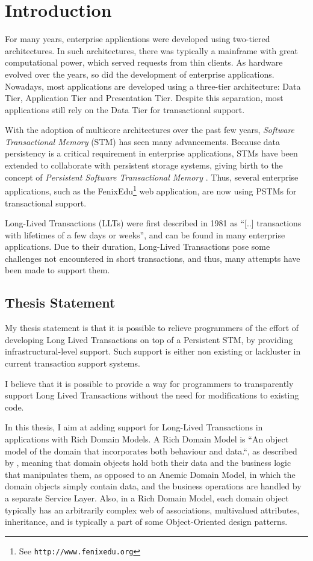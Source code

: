 \chapter{Introduction}

For many years, enterprise applications were developed using
two-tiered architectures. In such architectures, there was typically a
mainframe with great computational power, which served requests from
thin clients. As hardware evolved over the years, so did the
development of enterprise applications. Nowadays, most applications
are developed using a three-tier architecture: Data Tier, Application
Tier and Presentation Tier. Despite this separation, most applications
still rely on the Data Tier for transactional support.

With the adoption of multicore architectures over the past few years,
{\it Software Transactional Memory} (STM) has seen many advancements.
Because data persistency is a critical requirement in enterprise
applications, STMs have been extended to collaborate with persistent
storage systems, giving birth to the concept of {\it Persistent
  Software Transactional Memory} \cite{fernandes2011strict}. Thus,
several enterprise applications, such as the FenixEdu\footnote{See
  \texttt{http://www.fenixedu.org}} web application, are now using
PSTMs for transactional support.

Long-Lived Transactions (LLTs) were first described in 1981 as ``[..]
transactions with lifetimes of a few days or
weeks''\cite{gray1981transaction}, and can be found in many enterprise
applications. Due to their duration, Long-Lived Transactions pose some
challenges not encountered in short transactions, and thus, many
attempts have been made to support them.

\section{Thesis Statement}

My thesis statement is that it is possible to relieve programmers of
the effort of developing Long Lived Transactions on top of a
Persistent STM, by providing infrastructural-level support. Such
support is either non existing or lackluster in current transaction
support systems.

I believe that it is possible to provide a way for programmers to
transparently support Long Lived Transactions without the need for
modifications to existing code.

In this thesis, I aim at adding support for Long-Lived Transactions in
applications with Rich Domain Models.  A Rich Domain Model is ``An
object model of the domain that incorporates both behaviour and
data.``, as described by \cite{fowler2003patterns}, meaning that
domain objects hold both their data and the business logic that
manipulates them, as opposed to an Anemic Domain Model, in which the
domain objects simply contain data, and the business operations are
handled by a separate Service Layer. Also, in a Rich Domain Model,
each domain object typically has an arbitrarily complex web of
associations, multivalued attributes, inheritance, and is typically a
part of some Object-Oriented design patterns.

